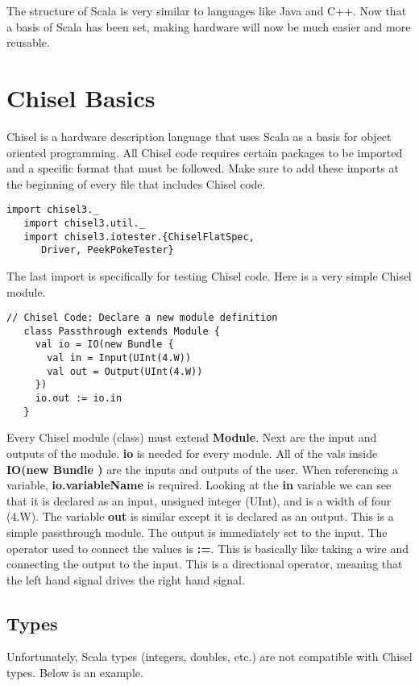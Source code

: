 \documentclass[12pt, letterpaper]{report}
\begin{document}
The structure of Scala is very similar to languages like Java and C++. Now that a basis of Scala has been 
set, making hardware will now be much easier and more reusable.
\chapter{Chisel Basics}
Chisel is a hardware description language that uses Scala as a basis for object oriented programming. 
All Chisel code requires certain packages to be imported and a specific format that must be followed.
Make sure to add these imports at the beginning of every file that includes Chisel code.

\begin{lstlisting}[style=scala]
   import chisel3._
   import chisel3.util._
   import chisel3.iotester.{ChiselFlatSpec, 
      Driver, PeekPokeTester}
\end{lstlisting}

The last import is specifically for testing Chisel code. Here is a very simple Chisel module.

\begin{lstlisting}[style=scala]
   // Chisel Code: Declare a new module definition
   class Passthrough extends Module {
     val io = IO(new Bundle {
       val in = Input(UInt(4.W))
       val out = Output(UInt(4.W))
     })
     io.out := io.in
   }
\end{lstlisting}

Every Chisel module (class) must extend \textbf{Module}. Next are the input and outputs of the module.
\textbf{io} is needed for every module. All of the vals inside \textbf{IO(new Bundle {})} are the 
inputs and outputs of the user. When referencing a variable, \textbf{io.variableName} is required.
Looking at the \textbf{in} variable we can see that it is declared as an input, unsigned integer (UInt),
and is a width of four (4.W). The variable \textbf{out} is similar except it is declared as an output.
This is a simple passthrough module. The output is immediately set to the input. The operator used to connect
the values is \textbf{:=}. This is basically like taking a wire and connecting the output to the input. This is
a directional operator, meaning that the left hand signal drives the right hand signal. 
\section{Types}
Unfortunately, Scala types (integers, doubles, etc.) are not compatible with Chisel types. Below is an example.
\end{document}
